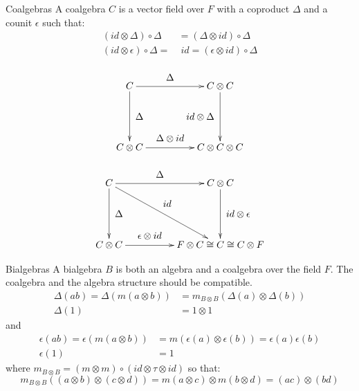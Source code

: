 \documentclass[pdf,colorBG,slideColor,fyma]{prosper}
\begin{document}
 {
\begin{slide}{Coalgebras}
A coalgebra $C$ is a vector field over $F$ with a coproduct $\Delta$ and a
counit $\epsilon$ such that:
\begin{align*}
(id \otimes \Delta) \circ \Delta & = (\Delta \otimes id) \circ \Delta \\
(id \otimes \epsilon) \circ \Delta = &\; id = (\epsilon \otimes id) \circ \Delta
\end{align*}
{
    \begin{minipage}{85pt} %
    \[
    \xymatrix@=50pt{
        C \ar[r]^-*+{\Delta} \ar[d]^-*+{\Delta}& C \otimes C \ar[d]_-*+{id \otimes \Delta}\\
        C \otimes C \ar[r]^-*+{\Delta \otimes id} & C \otimes C \otimes C \\
    }
    \]
    \end{minipage}
    \hspace{2cm} %
    \vline{}
    \begin{minipage}{85pt}
    \[
    \xymatrix@=50pt{
        C
        \ar[r]^-*+{\Delta}
        \ar[d]^-*+{\Delta}
        \ar[dr]^-*+{id} & C \otimes C \ar[d]^-*+{id \otimes \epsilon}\\
        C \otimes C \ar[r]^-*+{\epsilon \otimes id} & F \otimes C \cong C \cong C \otimes F \\
    }
    \]
    \end{minipage}
}
\end{slide}
}


\begin{slide}{Bialgebras}
A bialgebra $B$ is both an algebra and a coalgebra over the field $F$.
The coalgebra and the algebra structure should be compatible.
\begin{align*}
\Delta(ab) = \Delta(m(a \otimes b)) & = m_{B \otimes B}(\Delta(a) \otimes \Delta(b)) \\
\Delta(1) & = 1 \otimes 1
\end{align*}
and
\begin{align*}
\epsilon(ab) = \epsilon(m(a \otimes b)) &= m(\epsilon(a) \otimes \epsilon(b)) = \epsilon(a) \epsilon(b) \\
\epsilon(1) &= 1
\end{align*}
where $m_{B \otimes B} = (m \otimes m) \circ (id \otimes \tau \otimes id)$ so that:
\[
m_{B \otimes B}((a \otimes b) \otimes (c \otimes d)) = m(a \otimes c) \otimes m(b \otimes d) = (ac) \otimes (bd)
\]
\end{slide}
\end{document}
